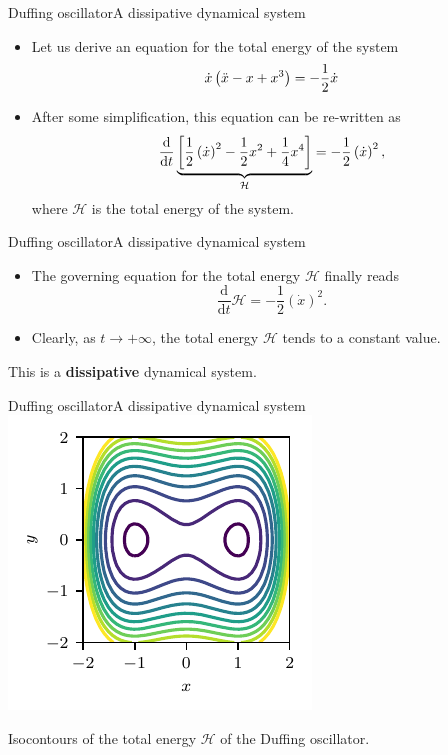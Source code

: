 \documentclass[usenames,dvipsnames,svgnames,10pt,aspectratio=169]{beamer}
\begin{document}
\begin{frame}[t, c]{Duffing oscillator}{A dissipative dynamical system}
	\begin{itemize}
		\item Let us derive an equation for the total energy of the system
		\begin{equation}
			\dot{x} \left( \ddot{x} - x + x^3 \right) = - \displaystyle \frac{1}{2} \dot{x}
			\notag
		\end{equation}

		\bigskip

		\item After some simplification, this equation can be re-written as
		\begin{equation}
			\displaystyle \frac{\mathrm{d}}{\mathrm{d}t} \underbrace{\left[ \displaystyle \frac{1}{2} \left( \dot{x} \right)^2 - \frac{1}{2}x^2 + \frac{1}{4}x^4 \right]}_{\mathcal{H}} = - \frac{1}{2} \left( \dot{x} \right)^2,
			\notag
		\end{equation}
		where $\mathcal{H}$ is the total energy of the system.
	\end{itemize}

	\vspace{1cm}
\end{frame}

\begin{frame}[t, c]{Duffing oscillator}{A dissipative dynamical system}
	\begin{itemize}
		\item The governing equation for the total energy $\mathcal{H}$ finally reads
		$$\displaystyle \frac{\mathrm{d}}{\mathrm{d}t} \mathcal{H} = -\frac{1}{2} \left( \dot{x} \right)^2.$$

		\bigskip

		\item Clearly, as $t \to +\infty$, the total energy $\mathcal{H}$ tends to a constant value.
	\end{itemize}

	\bigskip

	\begin{block}{}
		\centering
		This is a \alert{\textbf{dissipative}} dynamical system.
	\end{block}

	\vspace{1cm}
\end{frame}

\begin{frame}[t, c]{Duffing oscillator}{A dissipative dynamical system}
	\centering
	\includegraphics[width=.375\textwidth]{duffing_oscillator_potential}

	Isocontours of the total energy $\mathcal{H}$ of the Duffing oscillator.
\end{frame}
\end{document}
